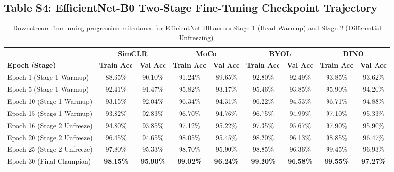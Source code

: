 \documentclass[11pt,a4paper]{article}
\begin{document}
\subsection*{Table S4: EfficientNet-B0 Two-Stage Fine-Tuning Checkpoint Trajectory}
\begin{table}[htbp]
\centering
\caption{Downstream fine-tuning progression milestones for EfficientNet-B0 across Stage 1 (Head Warmup) and Stage 2 (Differential Unfreezing).}
\label{tab:s4_eff_ft}
\begin{adjustbox}{max width=\textwidth}
\begin{tabular}{l c c c c c c c c}
\toprule
& \multicolumn{2}{c}{\textbf{SimCLR}} & \multicolumn{2}{c}{\textbf{MoCo}} & \multicolumn{2}{c}{\textbf{BYOL}} & \multicolumn{2}{c}{\textbf{DINO}} \\
\cmidrule(lr){2-3} \cmidrule(lr){4-5} \cmidrule(lr){6-7} \cmidrule(lr){8-9}
\textbf{Epoch (Stage)} & \textbf{Train Acc} & \textbf{Val Acc} & \textbf{Train Acc} & \textbf{Val Acc} & \textbf{Train Acc} & \textbf{Val Acc} & \textbf{Train Acc} & \textbf{Val Acc} \\
\midrule
Epoch 1 (Stage 1 Warmup)   & 88.65\% & 90.10\% & 91.24\% & 89.65\% & 92.80\% & 92.49\% & 93.85\% & 93.62\% \\
Epoch 5 (Stage 1 Warmup)   & 92.41\% & 91.47\% & 95.82\% & 93.17\% & 95.46\% & 93.85\% & 95.90\% & 94.20\% \\
Epoch 10 (Stage 1 Warmup)  & 93.15\% & 92.04\% & 96.34\% & 94.31\% & 96.22\% & 94.53\% & 96.71\% & 94.88\% \\
Epoch 15 (Stage 1 Warmup)  & 93.82\% & 92.83\% & 96.70\% & 94.76\% & 96.75\% & 94.99\% & 97.10\% & 95.33\% \\
\midrule
Epoch 16 (Stage 2 Unfreeze)& 94.80\% & 93.85\% & 97.12\% & 95.22\% & 97.35\% & 95.67\% & 97.90\% & 95.90\% \\
Epoch 20 (Stage 2 Unfreeze)& 96.45\% & 94.65\% & 98.05\% & 95.45\% & 98.20\% & 96.13\% & 98.85\% & 96.47\% \\
Epoch 25 (Stage 2 Unfreeze)& 97.80\% & 95.33\% & 98.70\% & 95.90\% & 98.85\% & 96.36\% & 99.45\% & 96.93\% \\
Epoch 30 (Final Champion)  & \textbf{98.15\%} & \textbf{95.90\%} & \textbf{99.02\%} & \textbf{96.24\%} & \textbf{99.20\%} & \textbf{96.58\%} & \textbf{99.55\%} & \textbf{97.27\%} \\
\bottomrule
\end{tabular}
\end{adjustbox}
\end{table}
\end{document}
